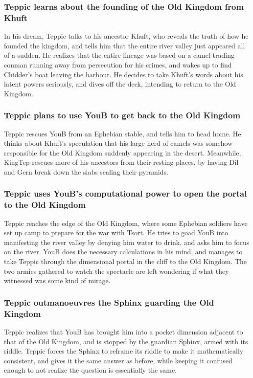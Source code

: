 \subsubsection{\Gls{Teppic} learns about the founding of the Old Kingdom from \Gls{Khuft}}
In his dream, \Gls{Teppic} talks to his ancestor \Gls{Khuft}, who reveals the truth of how he
founded the kingdom, and tells him that the entire river valley just appeared all of a sudden. He
realizes that the entire lineage was based on a camel-trading conman running away from persecution
for his crimes, and wakes up to find \Gls{Chidder}'s boat leaving the harbour. He decides to take
\Gls{Khuft}'s words about his latent powers seriously, and dives off the deck, intending to return
to the Old Kingdom.

\subsubsection{\Gls{Teppic} plans to use \Gls{YouB} to get back to the Old Kingdom}
\Gls{Teppic} rescues \Gls{YouB} from an Ephebian stable, and tells him to head home. He thinks about
\Gls{Khuft}'s speculation that his large herd of camels was somehow responsible for the Old Kingdom
suddenly appearing in the desert. Meanwhile, \Gls{KingTep} rescues more of his ancestors from their
resting places, by having \Gls{Dil} and \Gls{Gern} break down the slabs sealing their pyramids.

\subsubsection{\Gls{Teppic} uses \Gls{YouB}'s computational power to open the portal to the
    Old Kingdom}
\Gls{Teppic} reaches the edge of the Old Kingdom, where some Ephebian soldiers have set up camp to
prepare for the war with Tsort. He tries to goad \Gls{YouB} into manifesting the river valley by
denying him water to drink, and asks him to focus on the river. \Gls{YouB} does the necessary
calculations in his mind, and manages to take \Gls{Teppic} through the dimensional portal in the
cliff to the Old Kingdom. The two armies gathered to watch the spectacle are left wondering if what
they witnessed was some kind of mirage.

\subsubsection{\Gls{Teppic} outmanoeuvres the \Gls{Sphinx} guarding the Old Kingdom}
\Gls{Teppic} realizes that \Gls{YouB} has brought him into a pocket dimension adjacent to that of
the Old Kingdom, and is stopped by the guardian \Gls{Sphinx}, armed with its riddle. \Gls{Teppic}
forces the \Gls{Sphinx} to reframe its riddle to make it mathematically consistent, and gives it the
same answer as before, while keeping it confused enough to not realize the question is essentially
the same.

